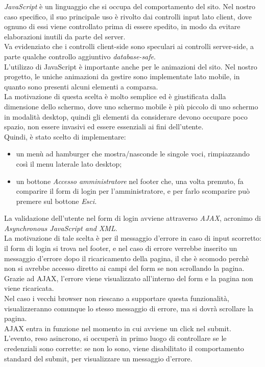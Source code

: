 ﻿\emph{JavaScript} è un linguaggio che si occupa del comportamento del sito. Nel nostro caso specifico, il suo principale uso è rivolto dai controlli 
input lato client, dove ognuno di essi viene controllato prima di essere spedito, in modo da evitare elaborazioni inutili da parte del server.\\
Va evidenziato che i controlli client-side sono speculari ai controlli server-side, a parte qualche controllo aggiuntivo \emph{database-safe}.\\
L'utilizzo di JavaScript è importante anche per le animazioni del sito. Nel nostro progetto, le uniche animazioni da gestire sono implementate 
lato mobile, in quanto sono presenti alcuni elementi a comparsa.\\
La motivazione di questa scelta è molto semplice ed è giustificata dalla dimensione dello schermo, dove uno schermo mobile è più piccolo di uno schermo
in modalità desktop, quindi gli elementi da considerare devono occupare poco spazio, non essere invasivi ed essere essenziali ai fini dell'utente. \\
Quindi, è stato scelto di implementare:
\begin{itemize}
    \item un menù ad hamburger che mostra/nasconde le singole voci, rimpiazzando così il menu laterale lato desktop;
    \item un bottone \emph{Accesso amministratore} nel footer che, una volta premuto, fa comparire il form di login per l'amministratore, e per farlo
    scomparire può premere sul bottone \emph{Esci.} 
\end{itemize}    

La validazione dell'utente nel form di login avviene attraverso \emph{AJAX}, acronimo di \emph{Asynchronous JavaScript and XML}.\\ 
La motivazione di tale scelta è per il messaggio d'errore in caso di input scorretto: il form di login si trova nel footer, e nel caso di errore 
verrebbe inserito un messaggio d'errore dopo il ricaricamento della pagina, il che è scomodo perchè non si avrebbe accesso diretto ai campi del form
se non scrollando la pagina.\\
Grazie ad AJAX, l'errore viene visualizzato all'interno del form e la pagina non viene ricaricata.\\
Nel caso i vecchi browser non riescano a supportare questa funzionalità, visualizzeranno comunque lo stesso messaggio di errore, ma si dovrà scrollare la pagina.\\
AJAX entra in funzione nel momento in cui avviene un click nel submit. L'evento, reso asincrono, si occuperà in primo luogo di controllare 
se le credenziali sono corrette: se non lo sono, viene disabilitato il comportamento standard del submit, per visualizzare 
un messaggio d'errore.\\